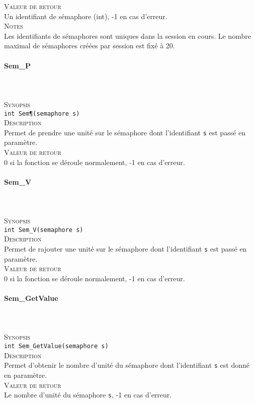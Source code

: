 \documentclass{report}
\newcommand{\myparagraph}[1]{\paragraph*{#1}\mbox{}\\}
\begin{document}
\textsc{Valeur de retour}\\
	Un identifiant de sémaphore (int), -1 en cas d'erreur.\\

\textsc{Notes}\\
	Les identifiants de sémaphores sont uniques dans la session en cours. Le nombre maximal de sémaphores créées par session est fixé à 20.\\
	
\myparagraph{Sem\_P}\\
\textsc{Synopsis}\\	
	\texttt{int Sem\P(semaphore s)}\\

\textsc{Description}\\
	Permet de prendre une unité sur le sémaphore dont l'identifiant \texttt{s} est passé en paramètre.\\
	
\textsc{Valeur de retour}\\
0 si la fonction se déroule normalement, -1 en cas d'erreur.\\

\myparagraph{Sem\_V}\\
\textsc{Synopsis}\\	

\texttt{int Sem\_V(semaphore s)}\\

\textsc{Description}\\
	Permet de rajouter une unité sur le sémaphore dont l'identifiant \texttt{s} est passé en paramètre.\\
	
\textsc{Valeur de retour}\\
0 si la fonction se déroule normalement, -1 en cas d'erreur.\\

\myparagraph{Sem\_GetValue}\\
\textsc{Synopsis}\\	
	\texttt{int Sem\_GetValue(semaphore s)}\\

\textsc{Description}\\
	Permet d'obtenir le nombre d'unité du sémaphore dont l'identifiant \texttt{s} est donné en paramètre.\\
	
\textsc{Valeur de retour}\\
Le nombre d'unité du sémaphore \texttt{s}, -1 en cas d'erreur.\\
\end{document}
